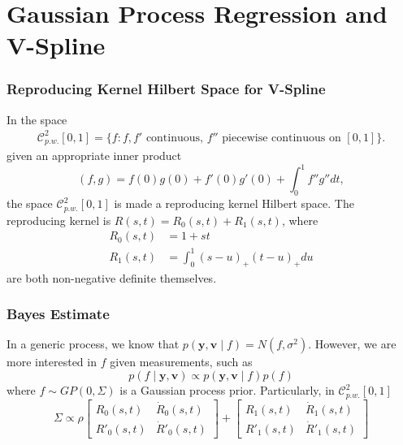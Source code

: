 \documentclass{beamer}
\begin{document}
\section{Gaussian Process Regression and V-Spline}

\begin{frame}
\frametitle{Reproducing Kernel Hilbert Space for V-Spline}

In the space \begin{align*}
\mathcal{C}_{p.w.}^{2}[0,1]=\{f:f,f' \mbox{ continuous, } f'' \mbox{ piecewise continuous on } [0,1] \}.
\end{align*} 
given an appropriate inner product
\begin{equation}
(f,g)=f(0) g(0)+f'(0) g'(0)+\int_{0}^{1}f''g''dt,
\end{equation}
the space $\mathcal{C}_{p.w.}^{2}[0,1]$ is made a reproducing kernel Hilbert space. The reproducing kernel is $R(s,t)=R_0(s,t)+R_1(s,t)$, where
\begin{align} \label{TractorSplineKernelR0}
R_0(s,t)&=1+st \\ \label{TractorSplineKernelR1}
R_1(s,t)&=\int_{0}^{1} (s-u)_+(t-u)_+du
\end{align}
are both non-negative definite themselves.


\end{frame}


\begin{frame}
\frametitle{Bayes Estimate}


In a generic process, we know that $p(\mathbf{y},\mathbf{v}\mid f) = N(f,\sigma^2)$. However, we are more interested in $f$ given measurements, such as 
\begin{equation}
p(f\mid \mathbf{y},\mathbf{v}) \propto p(\mathbf{y},\mathbf{v}\mid f)p(f)
\end{equation}
where $f\sim GP(0,\Sigma)$ is a Gaussian process prior. Particularly, in $\mathcal{C}_{p.w.}^{2}[0,1]$ 
\begin{equation}
\Sigma\propto  \rho\begin{bmatrix}
R_0(s,t) & \dot{R}_0(s,t)\\R'_0(s,t) &\dot{R}'_0(s,t) \end{bmatrix} + \begin{bmatrix}
R_1(s,t) & \dot{R}_1(s,t)\\R'_1(s,t) &\dot{R}'_1(s,t) \end{bmatrix}
\end{equation}

\end{frame}
\end{document}
